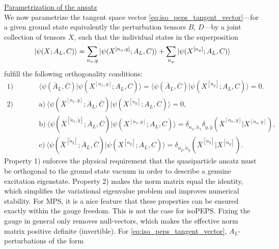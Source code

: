 \noindent \underline{Parametrization of the ansatz} \\[0.5em]
We now parametrize the tangent space vector \eqref{eq:iso_peps_tangent_vector}---for a given ground state equivalently the perturbation tensors $B$, $D$---by a joint collection of tensors $X$, such that the individual states in the superposition
\begin{equation}
	\ket{\psi(X; A_L, C)} = \sum_{n_x, y} \ket{\psi(X^{[n_x, y]}; A_L, C)} + \sum_{n_y} \ket{\psi(X^{[n_y]}; A_L, C)}
\end{equation}
fulfill the following orthogonality conditions:
\begin{equation} \label{eq:e_iso_peps_properties}
	\begin{array}{ll}
	\text{1) Ground state} 
	&\langle \psi( \overline{A}_L, \overline{C}) \vert \psi(X^{[n_x, y]}; A_L, C) \rangle
	= \langle \psi( \overline{A}_L, \overline{C}) \vert \psi(X^{[n_y]}; A_L, C) \rangle
	= 0. \\[0.5em]
	\text{2) Pairwise}
	& \text{a)}\: \langle \psi(\overline{X}^{[n_x, y]};  \overline{A}_L, \overline{C}) \vert \psi(X^{[n_y]}; A_L, C) \rangle = 0, \\[0.3em]
	& \text{b)}\:\langle \psi(\overline{X}^{[\tilde{n}_x, \tilde{y}]};  \overline{A}_L, \overline{C}) \vert \psi(X^{[n_x, y]}; A_L, C) \rangle = \delta_{n_x, \tilde{n}_x} \delta_{y, \tilde{y}}(\overline{X}^{[n_x, y]} \vert X^{[n_x, y]}), \\[0.3em]
	& \text{c)}\: \langle \psi(\overline{X}^{[\tilde{n}_y]};  \overline{A}_L, \overline{C}) \vert \psi(X^{[n_y]}; A_L, C) \rangle = \delta_{n_y, \tilde{n}_y} (\overline{X}^{[n_y]} \vert X^{[n_y]}).
	\end{array}
\end{equation}
Property 1) enforces the physical requirement that the quasiparticle ansatz must be orthogonal to the ground state vacuum in order to describe a genuine excitation eigenstate. Property 2) makes the norm matrix equal the identity, which simplifies the variational eigenvalue problem and improves numerical stability. For MPS, it is a nice feature that these properties can be ensured exactly within the gauge freedom. This is not the case for isoPEPS. Fixing the gauge in general only removes null-vectors, which makes the effective norm matrix positive definite (invertible). For \eqref{eq:iso_peps_tangent_vector}, $A_L$-perturbations of the form
